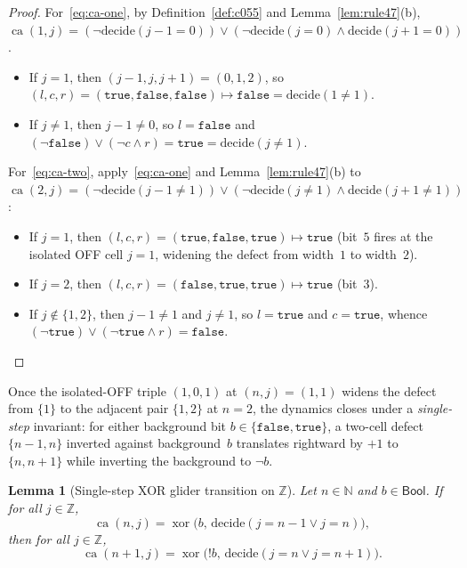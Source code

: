 \documentclass[11pt]{article}
\newtheorem{lemma}[theorem]{Lemma}
\theoremstyle{definition}
\newcommand{\N}{\mathbb{N}}
\newcommand{\Z}{\mathbb{Z}}
\newcommand{\ca}{\operatorname{ca}}
\begin{document}
\begin{proof}
For~\eqref{eq:ca-one}, by Definition~\ref{def:c055} and Lemma~\ref{lem:rule47}(b), $\ca(1, j) = (\neg \mathrm{decide}(j - 1 = 0)) \lor (\neg \mathrm{decide}(j = 0) \land \mathrm{decide}(j + 1 = 0))$.
\begin{itemize}
\item If $j = 1$, then $(j - 1, j, j + 1) = (0, 1, 2)$, so $(l, c, r) = (\mathtt{true}, \mathtt{false}, \mathtt{false}) \mapsto \mathtt{false} = \mathrm{decide}(1 \ne 1)$.
\item If $j \ne 1$, then $j - 1 \ne 0$, so $l = \mathtt{false}$ and $(\neg \mathtt{false}) \lor (\neg c \land r) = \mathtt{true} = \mathrm{decide}(j \ne 1)$.
\end{itemize}

For~\eqref{eq:ca-two}, apply~\eqref{eq:ca-one} and Lemma~\ref{lem:rule47}(b) to $\ca(2, j) = (\neg \mathrm{decide}(j - 1 \ne 1)) \lor (\neg \mathrm{decide}(j \ne 1) \land \mathrm{decide}(j + 1 \ne 1))$:
\begin{itemize}
\item If $j = 1$, then $(l, c, r) = (\mathtt{true}, \mathtt{false}, \mathtt{true}) \mapsto \mathtt{true}$ (bit~$5$ fires at the isolated OFF cell $j = 1$, widening the defect from width~$1$ to width~$2$).
\item If $j = 2$, then $(l, c, r) = (\mathtt{false}, \mathtt{true}, \mathtt{true}) \mapsto \mathtt{true}$ (bit~$3$).
\item If $j \notin \{1, 2\}$, then $j - 1 \ne 1$ and $j \ne 1$, so $l = \mathtt{true}$ and $c = \mathtt{true}$, whence $(\neg \mathtt{true}) \lor (\neg \mathtt{true} \land r) = \mathtt{false}$. \qedhere
\end{itemize}
\end{proof}

Once the isolated-OFF triple $(1, 0, 1)$ at $(n, j) = (1, 1)$ widens the defect from $\{1\}$ to the adjacent pair $\{1, 2\}$ at $n = 2$, the dynamics closes under a \emph{single-step} invariant: for either background bit $b \in \{\mathtt{false}, \mathtt{true}\}$, a two-cell defect $\{n - 1, n\}$ inverted against background~$b$ translates rightward by $+1$ to $\{n, n + 1\}$ while inverting the background to $\neg b$.

\begin{lemma}[Single-step XOR glider transition on $\Z$]
\label{lem:step-xor}
Let $n \in \N$ and $b \in \mathsf{Bool}$. If for all $j \in \Z$,
\[
\ca(n, j) = \operatorname{xor}\bigl(b,\, \mathrm{decide}(j = n - 1 \lor j = n)\bigr),
\]
then for all $j \in \Z$,
\[
\ca(n + 1, j) = \operatorname{xor}\bigl(!b,\, \mathrm{decide}(j = n \lor j = n + 1)\bigr).
\]
\end{lemma}
\end{document}
